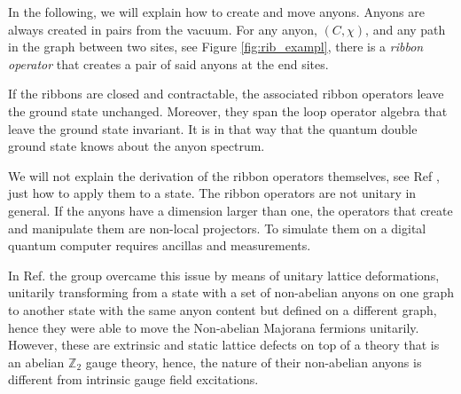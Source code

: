\documentclass[two column]{article}
\newcommand{\jovan}[1]{\textcolor{blue}{[#1]}}
\begin{document}
In the following, we will explain how to create and move anyons. Anyons are always created in pairs from the vacuum. 
%
%
%
For any anyon, $(C, \chi)$, and any path in the graph between two sites, see Figure \ref{fig:rib_exampl}, there is a \emph{ribbon operator} that creates a pair of said anyons at the end sites. 

If the ribbons are closed and contractable, the associated ribbon operators leave the ground state unchanged. Moreover, they span the loop operator algebra that leave the ground state invariant. It is in that way that the quantum double ground state knows about the anyon spectrum.

We will not explain the derivation of the ribbon operators themselves, see Ref \cite{Kitaev_2003,cui2018topological}, just how to apply them to a state.
%
%
The ribbon operators are not unitary in general. If the anyons have a dimension larger than one, the operators that create and manipulate them are non-local projectors. To simulate them on a digital quantum computer requires ancillas and measurements. 

In Ref. \cite{andersen2022observation} the group overcame this issue by means of unitary lattice deformations, unitarily transforming from a state with a set of non-abelian anyons on one graph to another state with the same anyon content but defined on a different graph, hence they were able to move the Non-abelian Majorana fermions unitarily. However, these are extrinsic and static lattice defects on top of a theory that is an abelian $\mathbb Z_2$ gauge theory, hence, the nature of their non-abelian anyons is different from intrinsic gauge field excitations.
\end{document}
